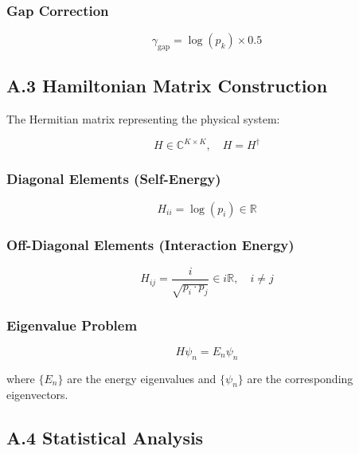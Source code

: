 \subsubsection*{Gap Correction}
\begin{equation}
\gamma_{\text{gap}} = \log(p_k) \times 0.5 \label{eq:gap_correction}
\end{equation}

\subsection*{A.3 Hamiltonian Matrix Construction}

The Hermitian matrix representing the physical system:

\begin{equation}
H \in \mathbb{C}^{K \times K}, \quad H = H^\dagger \label{eq:hamiltonian_def}
\end{equation}

\subsubsection*{Diagonal Elements (Self-Energy)}
\begin{equation}
H_{ii} = \log(p_i) \in \mathbb{R} \label{eq:diagonal_elements}
\end{equation}

\subsubsection*{Off-Diagonal Elements (Interaction Energy)}
\begin{equation}
H_{ij} = \frac{i}{\sqrt{p_i \cdot p_j}} \in i\mathbb{R}, \quad i \neq j \label{eq:offdiagonal_elements}
\end{equation}

\subsubsection*{Eigenvalue Problem}
\begin{equation}
H \psi_n = E_n \psi_n \label{eq:eigenvalue_problem}
\end{equation}

where $\{E_n\}$ are the energy eigenvalues and $\{\psi_n\}$ are the corresponding eigenvectors.

\subsection*{A.4 Statistical Analysis}


